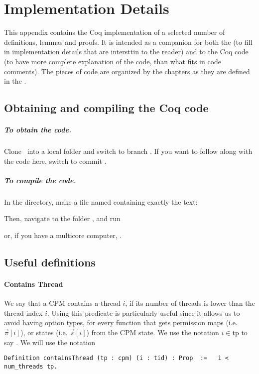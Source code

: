 \chapter{Implementation Details\label{ch:implementation}}

\lstset{numbers=left, stepnumber=1, firstnumber=last}
This appendix contains the Coq implementation of a selected number of definitions, lemmas and proofs. It is intended as a companion for both the  (to fill in implementation details that are intersttin to the reader) and to the Coq code (to have more complete explanation of the code, than what fits in code comments).  The pieces of code are organized by the chapters as they are defined in the .  

\section{Obtaining and compiling the Coq code}\label{sec:getcode}

\paragraph{To obtain the code.} Clone \githublink\ into a local folder  and switch to branch \githubbranch. If you want to follow along with the code here, switch to commit \githubcommit.

\paragraph{To compile the code.} In the  directory, make a file named    containing exactly the text:  


\noindent Then, navigate to the folder , and run 


\noindent or, if you have a multicore computer, .



\section{Useful definitions}\label{sec:usefuldefs}
\subsubsection{Contains Thread}
We say that a CPM contains a thread $i$, if its number of threads is lower than the thread index $i$. Using this predicate is particularly useful since it allows us to avoid having option types, for every function that gets permission maps (i.e. $\vec{\pi}[i]$), or states (i.e. $\vec{s}[i]$) from the CPM state. We use the notation $i \in \text{tp}$ to say  . 
We will use the notation 
\begin{lstlisting}[firstnumber=1]
Definition containsThread (tp : cpm) (i : tid) : Prop  :=   i < num_threads tp.
\end{lstlisting}

